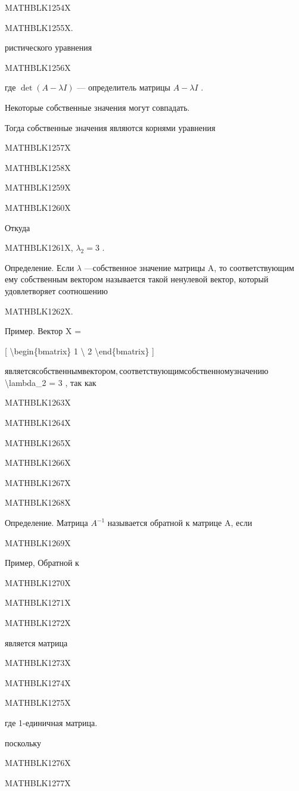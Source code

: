 \documentclass[
]{article}
\begin{document}
MATHBLK1254X

MATHBLK1255X.

ристического уравнения

MATHBLK1256X

где \(\det(A-\lambda I)\) --- определитель матрицы \(A-\lambda I\) .

Некоторые собственные значения могут совпадать.

Тогда собственные значения являются корнями уравнения

MATHBLK1257X

MATHBLK1258X

MATHBLK1259X

MATHBLK1260X

Откуда

MATHBLK1261X, \(\lambda_2 = 3\) .

Определение. Если \(\lambda\) ---собственное значение матрицы A, то
соответствующим ему собственным вектором называется такой ненулевой
вектор, который удовлетворяет соотношению

MATHBLK1262X.

Пример. Вектор X =

{[} \textbackslash begin\{bmatrix\} 1 \textbackslash{} 2
\textbackslash end\{bmatrix\} {]}

\(является собственным вектором, соответствующим собственному значению\)
\textbackslash lambda\_2 = 3 , так как

MATHBLK1263X

MATHBLK1264X

MATHBLK1265X

MATHBLK1266X

MATHBLK1267X

MATHBLK1268X

Определение. Матрица \(A^{-1}\) называется обратной к матрице A, если

MATHBLK1269X

Пример, Обратной к

MATHBLK1270X

MATHBLK1271X

MATHBLK1272X

является матрица

MATHBLK1273X

MATHBLK1274X

MATHBLK1275X

где 1-единичная матрица.

поскольку

MATHBLK1276X

MATHBLK1277X
\end{document}
